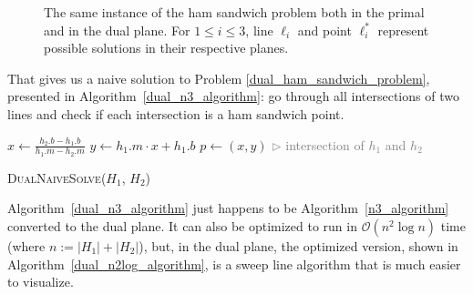 \documentclass{article}
\renewcommand{\And}{\textbf{and} }
\def\bigo{\mathcal{O}}
\begin{document}
\begin{figure}[htbp]
{
    }%
    \caption{The same instance of the ham sandwich problem both in the primal and in the dual plane. 
             For $1\leq i \leq 3$, line $\ell_i$ and point $\ell^*_i$ represent possible solutions in their respective planes.}
    \label{ham_sandwich_translation_figure}
\end{figure}

That gives us a naive solution to Problem \ref{dual_ham_sandwich_problem}, presented in Algorithm~\ref{dual_n3_algorithm}: go through all intersections of two lines and check if each intersection is a ham sandwich point.

\begin{algorithm}
\begin{algorithmic}[1]

    \State $x \gets \frac{h_2.b - h_1.b}{h_1.m - h_2.m}$
    \State $y \gets h_1.m \cdot x +h_1.b $
    \State $p \gets (x,y)$  \hfill {\small \textcolor{gray}{$\rhd$ intersection of $h_1$ and $h_2$}}
    \If{\textsc{MedianZone}($p$, $H_1$) \And \textsc{MedianZone}($p$, $H_2$)} 
    \EndIf
  \EndFor
 \EndFor
\end{algorithmic}
\caption{\textsc{DualNaiveSolve}($H_1$, $H_2$)}
\label{dual_n3_algorithm}
\end{algorithm}

Algorithm~\ref{dual_n3_algorithm} just happens to be Algorithm~\ref{n3_algorithm} converted to the dual plane.
It can also be optimized to run in $\bigo(n^2 \log n)$ time (where $n:=|H_1|+|H_2|$), but, in the dual plane, the optimized version, shown in Algorithm~\ref{dual_n2log_algorithm}, is a sweep line algorithm that is much easier to visualize.
\end{document}
